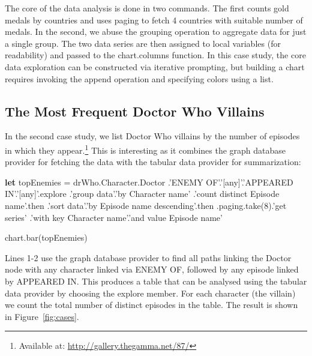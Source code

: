 \documentclass[manuscript,review,anonymous]{acmart}
\newcommand{\kvd}[1]{\textbf{#1}}
\newcommand{\ikvd}[1]{{\fontfamily{zi4}\selectfont\small #1}}
\begin{document}

The core of the data analysis is done in two commands. The first counts gold medals by countries
and uses paging to fetch 4 countries with suitable number of medals. In the second, we abuse the
grouping operation to aggregate data for just a single group. The two data series are then assigned
to local variables (for readability) and passed to the \ikvd{chart.columns} function.
In this case study, the core data exploration can be constructed via iterative prompting, but
building a chart requires invoking the \ikvd{append} operation and specifying colors using a list.

\subsection{The Most Frequent Doctor Who Villains}
In the second case study, we list Doctor Who villains by the number of episodes in which they
appear.\footnote{Available at: \url{http://gallery.thegamma.net/87/}} This is interesting as it
combines the graph database provider for fetching the data with the tabular data provider for
summarization:

\begin{thegamma}
\kvd{let} topEnemies = drWho.Character.Doctor
  .'ENEMY OF'.'[any]'.'APPEARED IN'.'[any]'.explore
  .'group data'.'by Character name'
    .'count distinct Episode name'.then
  .'sort data'.'by Episode name descending'.then
  .paging.take(8).'get series'
    .'with key Character name'.'and value Episode name'

chart.bar(topEnemies)
\end{thegamma}

Lines 1-2 use the graph database provider to find all paths linking the Doctor node with any
character linked via \ikvd{ENEMY OF}, followed by any episode linked by \ikvd{APPEARED IN}.
This produces a table that can be analysed using the tabular data provider by choosing the
\ikvd{explore} member. For each character (the villain) we count the total number of
distinct episodes in the table. The result is shown in Figure~\ref{fig:cases}.
\end{document}
